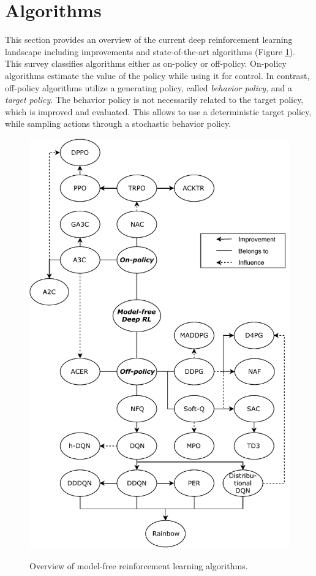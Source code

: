     \section{Algorithms \label{sec:algorithms}}
	This section provides an overview of the current deep reinforcement learning landscape including improvements and state-of-the-art algorithms (Figure \ref{fig:overview}). 
	This survey classifies algorithms either as on-policy or off-policy.
	On-policy algorithms estimate the value of the policy while using it for control.
	In contrast, off-policy algorithms utilize a generating policy, called \textit{behavior policy}, and a \textit{target policy}.
	The behavior policy is not necessarily related to the target policy, which is improved and evaluated.
	This allows to use a deterministic target policy, while sampling actions through a stochastic behavior policy. \cite{Sutton2018}
	\begin{figure}[!t]
		\centering
		\includegraphics[height=.75\textheight]{images/tree3.pdf}
		\label{fig:overview}
		\caption{Overview of model-free reinforcement learning algorithms.}
	\end{figure}
		
